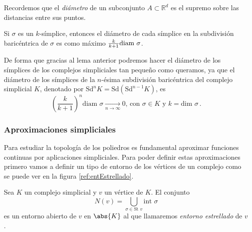 Recordemos que el \emph{diámetro} de un subconjunto $A \subset \mathbb{R}^d$ es el supremo sobre las distancias entre sus puntos. 

\begin{lemma}
Si $\sigma$ es un $k$-símplice, entonces el diámetro de cada símplice en la subdivisión baricéntrica de $\sigma$ es como máximo $\frac{k}{k+1}\text{\rm diam }\sigma$.
\end{lemma}

De forma que gracias al lema anterior podremos hacer el diámetro de los símplices de los complejos simpliciales tan pequeño como queramos, ya que el diámetro de los símplices de la $n$-ésima subdivisión baricéntrica del complejo simplicial $K$, denotado por $\text{Sd}^nK = \text{Sd}(\text{Sd}^{n - 1}K)$, es 
\[
\left ( \frac{k}{k+1} \right )^n \text{diam } \sigma  \underset{n \to \infty}{\longrightarrow} 0 \text{, con } \sigma \in K \text{ y } k = \text{dim } \sigma\,.
\]

\subsubsection*{Aproximaciones simpliciales}
Para estudiar la topología de los poliedros es fundamental aproximar funciones continuas por aplicaciones simpliciales. Para poder definir estas aproximaciones primero vamos a definir un tipo de entorno de los vértices de un complejo como se puede ver en la figura \ref{ref:entEstrellado}.

\begin{definition}
Sea $K$ un complejo simplicial y $v$ un vértice de $K$. El conjunto
\[
N(v) = \bigcup_{\sigma \in \text{St } v} \text{int }\sigma
\]
es un entorno abierto de $v$ en $\abs{K}$ al que llamaremos \emph{entorno estrellado} de $v$.
\end{definition}

